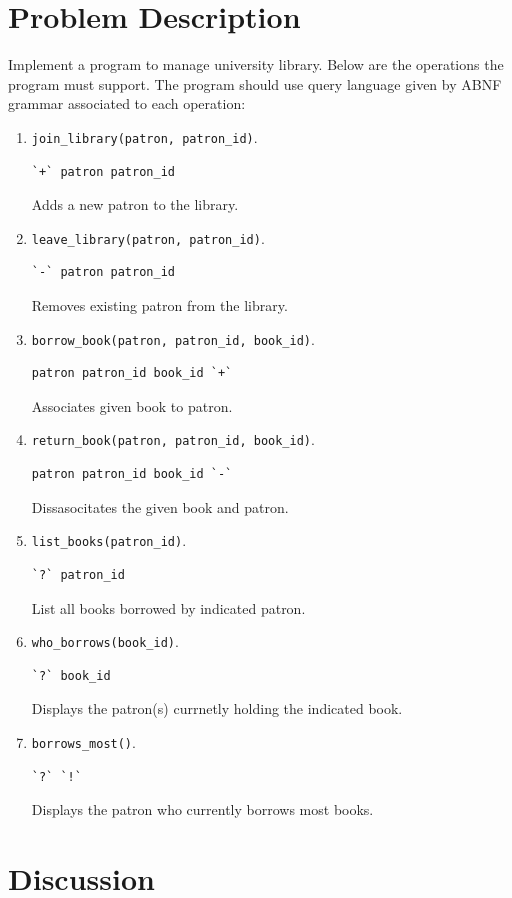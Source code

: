\documentclass[11pt]{article}
\begin{document}
\section{Problem Description}
\label{sec-1}
Implement a program to manage university library.  Below are the operations
the program must support.  The program should use query language given by ABNF
grammar associated to each operation:
\begin{enumerate}
\item \texttt{join\_library(patron, patron\_id)}.
\begin{verbatim}
`+` patron patron_id
\end{verbatim}
Adds a new patron to the library.
\item \texttt{leave\_library(patron, patron\_id)}.
\begin{verbatim}
`-` patron patron_id
\end{verbatim}
Removes existing patron from the library.
\item \texttt{borrow\_book(patron, patron\_id, book\_id)}.
\begin{verbatim}
patron patron_id book_id `+`
\end{verbatim}
Associates given book to patron.
\item \texttt{return\_book(patron, patron\_id, book\_id)}.
\begin{verbatim}
patron patron_id book_id `-`
\end{verbatim}
Dissasocitates the given book and patron.
\item \texttt{list\_books(patron\_id)}.
\begin{verbatim}
`?` patron_id
\end{verbatim}
List all books borrowed by indicated patron.
\item \texttt{who\_borrows(book\_id)}.
\begin{verbatim}
`?` book_id
\end{verbatim}
Displays the patron(s) currnetly holding the indicated book.
\item \texttt{borrows\_most()}.
\begin{verbatim}
`?` `!`
\end{verbatim}
Displays the patron who currently borrows most books.
\end{enumerate}

\section{Discussion}
\label{sec-2}
\end{document}
